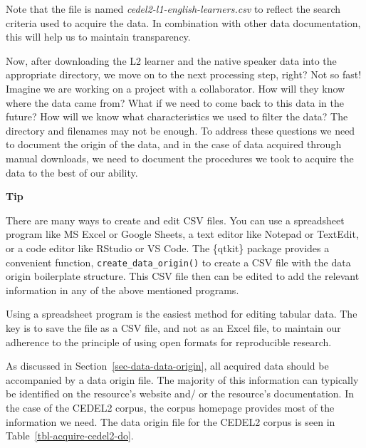 \documentclass[
  letterpaper,
  krantz1]{latex/krantz-mod}
\theoremstyle{definition}
\theoremstyle{definition}
\theoremstyle{remark}
\begin{document}
Note that the file is named \emph{cedel2-l1-english-learners.csv} to
reflect the search criteria used to acquire the data. In combination
with other data documentation, this will help us to maintain
transparency.

Now, after downloading the L2 learner and the native speaker data into
the appropriate directory, we move on to the next processing step,
right? Not so fast! Imagine we are working on a project with a
collaborator. How will they know where the data came from? What if we
need to come back to this data in the future? How will we know what
characteristics we used to filter the data? The directory and filenames
may not be enough. To address these questions we need to document the
origin of the data, and in the case of data acquired through manual
downloads, we need to document the procedures we took to acquire the
data to the best of our ability.

\begin{tcolorbox}[enhanced jigsaw, leftrule=.75mm, colframe=quarto-callout-color-frame, left=2mm, colback=white, toprule=.15mm, breakable, arc=.35mm, opacityback=0, bottomrule=.15mm, rightrule=.15mm]

\textbf{ Tip}

There are many ways to create and edit CSV files. You can use a
spreadsheet program like MS Excel or Google Sheets, a text editor like
Notepad or TextEdit, or a code editor like RStudio or VS Code. The
\{qtkit\} package provides a convenient function,
\texttt{create\_data\_origin()} to create a CSV file with the data
origin boilerplate structure. This CSV file then can be edited to add
the relevant information in any of the above mentioned programs.

Using a spreadsheet program is the easiest method for editing tabular
data. The key is to save the file as a CSV file, and not as an Excel
file, to maintain our adherence to the principle of using open formats
for reproducible research.

\end{tcolorbox}

As discussed in Section~\ref{sec-data-data-origin}, all acquired data
should be accompanied by a data origin file. The majority of this
information can typically be identified on the resource's website and/
or the resource's documentation. In the case of the CEDEL2 corpus, the
corpus homepage provides most of the information we need. The data
origin file for the CEDEL2 corpus is seen in
Table~\ref{tbl-acquire-cedel2-do}.
\end{document}
